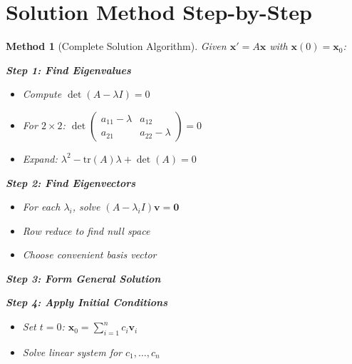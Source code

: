 \documentclass[12pt]{article}
\newtheorem{method}{Method}
\begin{document}

\section{Solution Method Step-by-Step}

\begin{method}[Complete Solution Algorithm]
Given $\mathbf{x}' = A\mathbf{x}$ with $\mathbf{x}(0) = \mathbf{x}_{0}$:

\textbf{Step 1: Find Eigenvalues}
\begin{itemize}
\item Compute $\det(A - \lambda I) = 0$
\item For $2 \times 2$: $\det\begin{pmatrix} a_{11}-\lambda & a_{12} \\ a_{21} & a_{22}-\lambda \end{pmatrix} = 0$
\item Expand: $\lambda^{2} - \text{tr}(A)\lambda + \det(A) = 0$
\end{itemize}

\textbf{Step 2: Find Eigenvectors}
\begin{itemize}
\item For each $\lambda_{i}$, solve $(A - \lambda_{i} I)\mathbf{v} = \mathbf{0}$
\item Row reduce to find null space
\item Choose convenient basis vector
\end{itemize}

\textbf{Step 3: Form General Solution}

\textbf{Step 4: Apply Initial Conditions}
\begin{itemize}
\item Set $t = 0$: $_{0} = \sum_{i=1}^{n} c_{i} _{i}$
\item Solve linear system for $c_{1}, \ldots, c_{n}$
\end{itemize}
\end{method}
\end{document}
